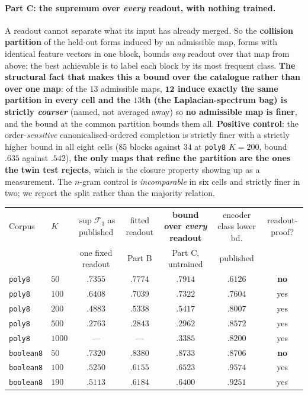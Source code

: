\paragraph{Part C: the supremum over \emph{every} readout, with nothing trained.} A readout cannot separate what its input has already merged. So the \textbf{collision partition} of the held-out forms induced by an admissible map, forms with identical feature vectors in one block, bounds \emph{any} readout over that map from above: the best achievable is to label each block by its most frequent class. \textbf{The structural fact that makes this a bound over the catalogue rather than over one map}: of the $13$ admissible maps, \textbf{$\mathbf{12}$ induce exactly the same partition in every cell and the $13$th (the Laplacian-spectrum bag) is strictly \emph{coarser}} (named, not averaged away) so \textbf{no admissible map is finer}, and the bound at the common partition bounds them all. \textbf{Positive control}: the order-\emph{sensitive} canonicalised-ordered completion is strictly finer with a strictly higher bound in all eight cells ($85$ blocks against $34$ at \texttt{poly8} $K{=}200$, bound $.635$ against $.542$), \textbf{the only maps that refine the partition are the ones the twin test rejects}, which is the closure property showing up as a measurement. The $n$-gram control is \emph{incomparable} in six cells and strictly finer in two; we report the split rather than the majority relation.

\begin{center}
\scriptsize
\setlength{\tabcolsep}{3pt}
\begin{tabular}{@{}llcccc c@{}}
\toprule
Corpus & $K$ & $\sup\mathcal{F}_3$ as published & fitted readout & \textbf{bound over \emph{every} readout} & encoder class lower bd. & readout-proof? \\
 & & {\scriptsize one fixed readout} & {\scriptsize Part B} & {\scriptsize Part C, untrained} & {\scriptsize published} & \\
\midrule
\texttt{poly8} & $50$   & $.7355$ & $.7774$ & $.7914$ & $.6126$ & \textbf{no} \\
\texttt{poly8} & $100$  & $.6408$ & $.7039$ & $.7322$ & $.7604$ & yes \\
\texttt{poly8} & $200$  & $.4883$ & $.5338$ & $.5417$ & $.8007$ & yes \\
\texttt{poly8} & $500$  & $.2763$ & $.2843$ & $.2962$ & $.8572$ & yes \\
\texttt{poly8} & $1000$ & --- & --- & $.3385$ & $.8200$ & yes \\
\midrule
\texttt{boolean8} & $50$  & $.7320$ & $.8380$ & $.8733$ & $.8706$ & \textbf{no} \\
\texttt{boolean8} & $100$ & $.5250$ & $.6155$ & $.6523$ & $.9574$ & yes \\
\texttt{boolean8} & $190$ & $.5113$ & $.6184$ & $.6400$ & $.9251$ & yes \\
\bottomrule
\end{tabular}
\end{center}

